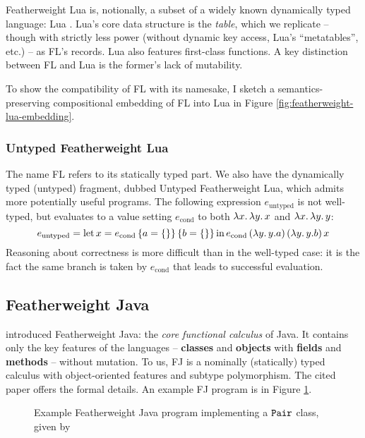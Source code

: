 Featherweight Lua is, notionally, a subset of a widely known dynamically typed language: Lua \cite{lua54}.
Lua's core data structure is the \emph{table}, which we replicate -- though with strictly less power (without dynamic key access, Lua's ``metatables'', etc.) -- as FL's records. 
Lua also features first-class functions.
A key distinction between FL and Lua is the former's lack of mutability. 

To show the compatibility of FL with its namesake, I sketch a semantics-preserving compositional embedding of FL into Lua in Figure \ref{fig:featherweight-lua-embedding}.

\subsubsection{Untyped Featherweight Lua}

The name FL refers to its statically typed part. We also have the dynamically typed (untyped) fragment, dubbed Untyped Featherweight Lua, which admits more potentially useful programs. 
The following expression $e_\mathrm{untyped}$ is not well-typed, but evaluates to a value setting $e_\mathrm{cond}$ to both $\lambda {x} \ldotp \lambda {y} \ldotp x$ and $\lambda {x} \ldotp \lambda {y} \ldotp y$:
$$ e_\mathrm{untyped} = \fllet{x}{e_\mathrm{cond}\,\flrec{a=\flrec{}}\,\flrec{b=\flrec{}}} e_\mathrm{cond}\,(\fllam y \flproj{y}{a})\,(\fllam y y{.}b)\,x  $$
Reasoning about correctness is more difficult than in the well-typed case: it is the fact the same branch is taken by $e_\mathrm{cond}$ that leads to successful evaluation.

\subsection{Featherweight Java}
\label{subsec:featherweight-java}

\textcite{featherweight-java} introduced Featherweight Java: the \emph{core functional calculus} of Java. It contains only the key features of the languages -- \textbf{classes} and \textbf{objects} with \textbf{fields} and \textbf{methods} -- without mutation. To us, FJ is a nominally (statically) typed calculus with object-oriented features and subtype polymorphism. The cited paper offers the formal details. An example FJ program is in Figure \ref{fig:featherweight-java}.

\begin{figure}
    \centering
    
    \caption{Example Featherweight Java program implementing a $\texttt{Pair}$ class, given by \textcite{featherweight-java}}
    \label{fig:featherweight-java}
\end{figure}

